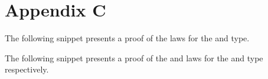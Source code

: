 %
%

\chapter{Appendix C}
\label{app:c}

The following snippet presents a proof of the  laws for the  and  type.


The following snippet presents a proof of the  and  laws for the  and  type respectively.

